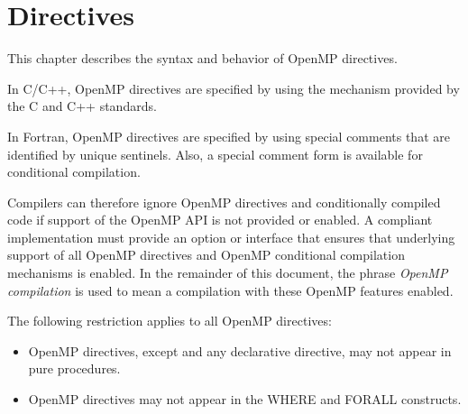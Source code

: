 \chapter{Directives}
\label{chap:Directives}
This chapter describes the syntax and behavior of OpenMP directives.

\begin{ccppspecific}
In C/C++, OpenMP directives are specified by using the  mechanism 
provided by the C and C++ standards.
\end{ccppspecific}

\begin{fortranspecific}
In Fortran, OpenMP directives are specified by using special comments that are
identified by unique sentinels. Also, a special comment form is available for 
conditional compilation.
\end{fortranspecific}

Compilers can therefore ignore OpenMP directives and conditionally compiled code if
support of the OpenMP API is not provided or enabled. A compliant implementation
must provide an option or interface that ensures that underlying support of all OpenMP
directives and OpenMP conditional compilation mechanisms is enabled. In the
remainder of this document, the phrase \emph{OpenMP compilation} is used to mean a
compilation with these OpenMP features enabled.

\begin{samepage}
\begin{fortranspecific}
\restrictions
The following restriction applies to all OpenMP directives:
\begin{itemize}
  \item OpenMP directives, except  and any declarative directive,
 may not appear in pure procedures.
\item OpenMP directives may not appear in the WHERE and FORALL constructs.
\end{itemize}
\end{fortranspecific}
\end{samepage}


















